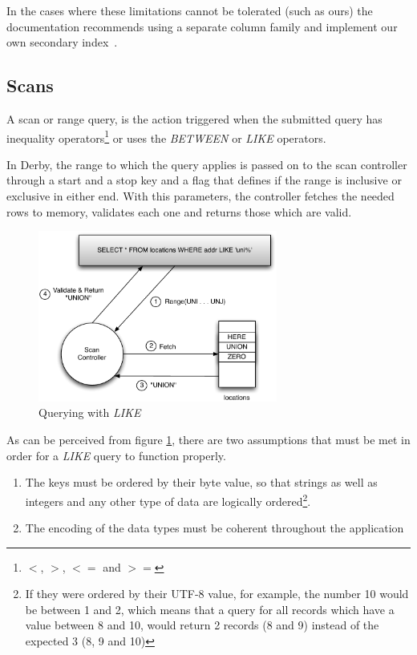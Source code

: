 In the cases where these limitations cannot be tolerated (such as ours) the documentation recommends using a separate column family and implement our own secondary index~\cite{secindex}. 

\subsection{Scans}
\label{sec:derby_scans}

A scan or range query, is the action triggered when the submitted query has inequality operators\footnote{$<$, $>$, $<=$ and $>=$} or uses the \emph{BETWEEN} or \emph{LIKE} operators.

In Derby, the range to which the query applies is passed on to the scan controller through a start and a stop key and a flag that defines if the range is inclusive or exclusive in either end. With this parameters, the controller fetches the needed rows to memory, validates each one and returns those which are valid.

\begin{figure}[!h]
  \centering    
  \includegraphics[width=0.7\textwidth]{images/likescan}
  \caption{Querying with \emph{LIKE}}
  \label{fig:likescan}
\end{figure}

As can be perceived from figure \ref{fig:likescan}, there are two assumptions that must be met in order for a \emph{LIKE} query to function properly.

\begin{enumerate}
	\item The keys must be ordered by their byte value, so that strings as well as integers and any other type of data are logically ordered\footnote{If they were ordered by their UTF-8 value, for example, the number 10 would be between 1 and 2, which means that a query for all records which have a value between 8 and 10, would return 2 records (8 and 9) instead of the expected 3 (8, 9 and 10)}.
	\item The encoding of the data types must be coherent throughout the application 
\end{enumerate}

